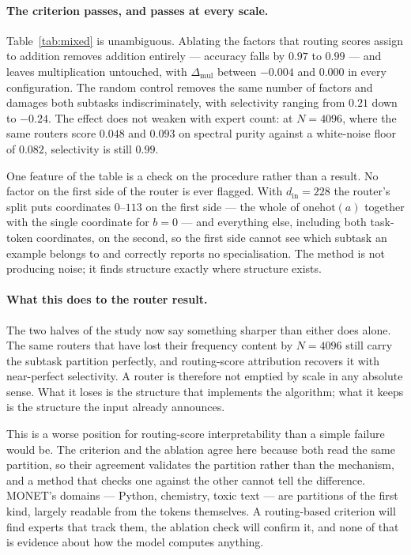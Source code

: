 \paragraph{The criterion passes, and passes at every scale.} Table~\ref{tab:mixed}
is unambiguous. Ablating the factors that routing scores assign to addition
removes addition entirely --- accuracy falls by $0.97$ to $0.99$ --- and leaves
multiplication untouched, with $\Delta_{\text{mul}}$ between $-0.004$ and
$0.000$ in every configuration. The random control removes the same number of
factors and damages both subtasks indiscriminately, with selectivity ranging
from $0.21$ down to $-0.24$. The effect does not weaken with expert count: at
$N = 4096$, where the same routers score $0.048$ and $0.093$ on spectral
purity against a white-noise floor of $0.082$, selectivity is still $0.99$.

One feature of the table is a check on the procedure rather than a result.
No factor on the first side of the router is ever flagged. With $d_{\text{in}} = 228$ the router's split puts coordinates $0$--$113$ on the
first side --- the whole of $\mathrm{onehot}(a)$ together with the single
coordinate for $b = 0$ --- and everything else, including both task-token
coordinates, on the second, so the first side cannot
see which subtask an example belongs to and correctly reports no
specialisation. The method is not producing noise; it finds structure exactly
where structure exists.

\paragraph{What this does to the router result.} The two halves of the study
now say something sharper than either does alone. The same routers that have
lost their frequency content by $N = 4096$ still carry the subtask partition
perfectly, and routing-score attribution recovers it with near-perfect
selectivity. A router is therefore not emptied by scale in any absolute sense.
What it loses is the structure that implements the algorithm; what it keeps is
the structure the input already announces.

This is a worse position for routing-score interpretability than a simple
failure would be. The criterion and the ablation agree here because both read
the same partition, so their agreement validates the partition rather than the
mechanism, and a method that checks one against the other cannot tell the
difference. MONET's domains --- Python, chemistry, toxic text --- are partitions
of the first kind, largely readable from the tokens themselves. A routing-based
criterion will find experts that track them, the ablation check will confirm
it, and none of that is evidence about how the model computes anything.

